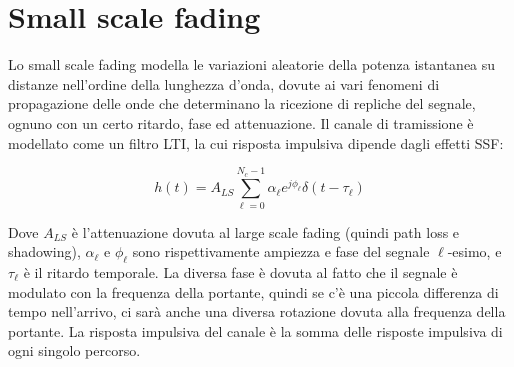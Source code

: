 \section*{Small scale fading}

Lo small scale fading modella le variazioni aleatorie della potenza istantanea su distanze nell'ordine della lunghezza d'onda, dovute ai vari fenomeni di propagazione delle onde che determinano la ricezione di repliche del segnale, ognuno con un certo ritardo, fase ed attenuazione.
Il canale di tramissione è modellato come un filtro LTI, la cui risposta impulsiva dipende dagli effetti SSF:

\[
    h(t) = A_{LS} \sum_{\ell=0}^{N_c-1} \alpha_{\ell} e^{j\phi_{\ell}} \delta(t - \tau_{\ell})
\]

Dove \( A_{LS} \) è l'attenuazione dovuta al large scale fading (quindi path loss e shadowing), \( \alpha_{\ell} \) e \( \phi_{\ell} \) sono rispettivamente ampiezza e fase del segnale \(\ell\)-esimo, e \( \tau_{\ell} \) è il ritardo temporale.
La diversa fase è dovuta al fatto che il segnale è modulato con la frequenza della portante, quindi se c'è una piccola differenza di tempo nell'arrivo, ci sarà anche una diversa rotazione dovuta alla frequenza della portante.
La risposta impulsiva del canale è la somma delle risposte impulsiva di ogni singolo percorso.

